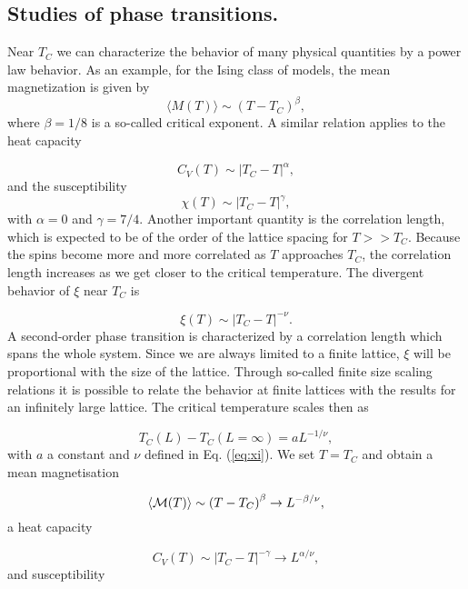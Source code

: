 \documentclass[twoside,twocolumn]{article}
\begin{document}
\subsection{Studies of phase transitions.}
Near $T_C$ we can characterize the behavior of many physical quantities
by a power law behavior.
As an example, for the Ising class of models, 
the mean magnetization is given by
\[
  \langle M(T) \rangle \sim \left(T-T_C\right)^{\beta},
\]
where $\beta=1/8$ is a so-called critical exponent. A similar relation
applies to the heat capacity

\[
  C_V(T) \sim \left|T_C-T\right|^{\alpha},
\]
and the susceptibility
\begin{equation}
  \chi(T) \sim \left|T_C-T\right|^{\gamma},
\end{equation}
with $\alpha = 0$ and $\gamma = 7/4$.
Another important quantity is the correlation length, which is expected
to be of the order of the lattice spacing for $T>> T_C$. Because the spins
become more and more correlated as $T$ approaches $T_C$, the correlation
length increases as we get closer to the critical temperature. The divergent
behavior of $\xi$ near $T_C$ 
is

\begin{equation}
  \xi(T) \sim \left|T_C-T\right|^{-\nu}.
  \label{eq:xi}
\end{equation}
A second-order phase transition is characterized by a
correlation length which spans the whole system.
Since we are always limited to a finite lattice, $\xi$ will
be proportional with the size of the lattice. 
Through so-called finite size scaling relations
it is possible to relate the behavior at finite lattices with the 
results for an infinitely large lattice.
The critical temperature scales then as

\begin{equation}
 T_C(L)-T_C(L=\infty) = aL^{-1/\nu},
 \label{eq:tc}
\end{equation}
with  $a$ a constant and  $\nu$ defined in Eq. (\ref{eq:xi}).
We set $T=T_C$ and obtain a mean magnetisation

\begin{equation}
  \langle {\cal M}(T) \rangle \sim \left(T-T_C\right)^{\beta}
  \rightarrow L^{-\beta/\nu},
  \label{eq:scale1}
\end{equation}
a heat capacity

\begin{equation}
  C_V(T) \sim \left|T_C-T\right|^{-\gamma} \rightarrow L^{\alpha/\nu},
  \label{eq:scale2}
\end{equation}
and susceptibility
\end{document}
